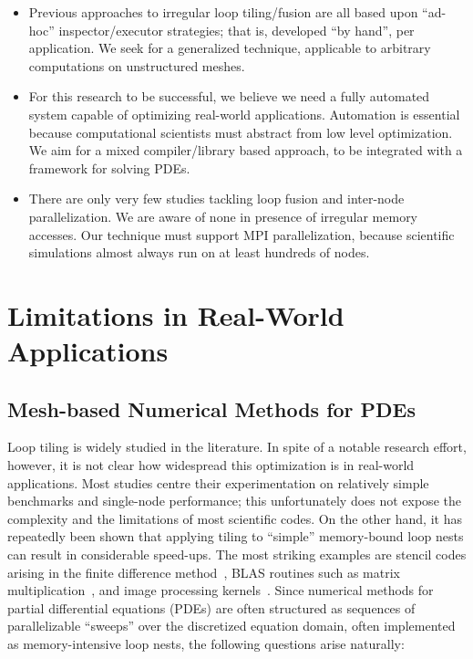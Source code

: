 \begin{itemize}
\item Previous approaches to irregular loop tiling/fusion are all based upon ``ad-hoc'' inspector/executor strategies; that is, developed ``by hand'', per application. We seek for a generalized technique, applicable to arbitrary computations on unstructured meshes.
\item For this research to be successful, we believe we need a fully automated system capable of optimizing real-world applications. Automation is essential because computational scientists must abstract from low level optimization. We aim for a mixed compiler/library based approach, to be integrated with a framework for solving PDEs.
\item There are only very few studies tackling loop fusion and inter-node parallelization. We are aware of none in presence of irregular memory accesses. Our technique must support MPI parallelization, because scientific simulations almost always run on at least hundreds of nodes.
\end{itemize}




\section{Limitations in Real-World Applications}
\label{sec:tiling:limits}

\subsection{Mesh-based Numerical Methods for PDEs}
Loop tiling is widely studied in the literature. In spite of a notable research effort, however, it is not clear how widespread this optimization is in real-world applications. Most studies centre their experimentation on relatively simple benchmarks and single-node performance; this unfortunately does not expose the complexity and the limitations of most scientific codes. On the other hand, it has repeatedly been shown that applying tiling to ``simple'' memory-bound loop nests can result in considerable speed-ups. The most striking examples are stencil codes arising in the finite difference method~\cite{stencil-tiling}, BLAS routines such as matrix multiplication~\cite{MKL}, and image processing kernels~\cite{Halide}. Since numerical methods for partial differential equations (PDEs) are often structured as sequences of parallelizable ``sweeps'' over the discretized equation domain, often implemented as memory-intensive loop nests, the following questions arise naturally: 

